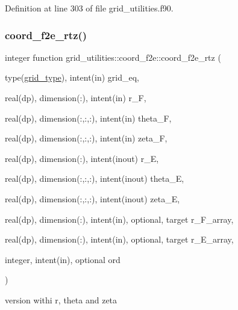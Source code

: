 Definition at line 303 of file grid\+\_\+utilities.\+f90.

\mbox{\label{interfacegrid__utilities_1_1coord__f2e_a3ab9822d623e86babe9eb47f99c9434e}} 
\subsubsection{\texorpdfstring{coord\+\_\+f2e\+\_\+rtz()}{coord\_f2e\_rtz()}}
{\footnotesize\ttfamily integer function grid\+\_\+utilities\+::coord\+\_\+f2e\+::coord\+\_\+f2e\+\_\+rtz (\begin{DoxyParamCaption}\item[{type(\hyperlink{structgrid__vars_1_1grid__type}{grid\+\_\+type}), intent(in)}]{grid\+\_\+eq,  }\item[{real(dp), dimension(\+:), intent(in)}]{r\+\_\+F,  }\item[{real(dp), dimension(\+:,\+:,\+:), intent(in)}]{theta\+\_\+F,  }\item[{real(dp), dimension(\+:,\+:,\+:), intent(in)}]{zeta\+\_\+F,  }\item[{real(dp), dimension(\+:), intent(inout)}]{r\+\_\+E,  }\item[{real(dp), dimension(\+:,\+:,\+:), intent(inout)}]{theta\+\_\+E,  }\item[{real(dp), dimension(\+:,\+:,\+:), intent(inout)}]{zeta\+\_\+E,  }\item[{real(dp), dimension(\+:), intent(in), optional, target}]{r\+\_\+\+F\+\_\+array,  }\item[{real(dp), dimension(\+:), intent(in), optional, target}]{r\+\_\+\+E\+\_\+array,  }\item[{integer, intent(in), optional}]{ord }\end{DoxyParamCaption})}



version withi r, theta and zeta 


